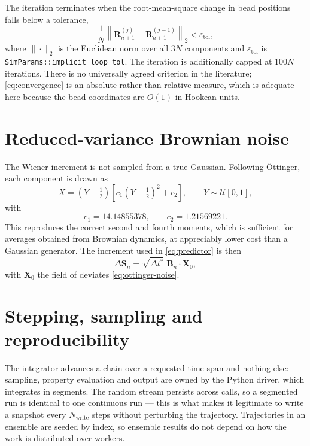\documentclass[11pt,a4paper]{report}
\newcommand{\B}{\bm{B}}
\newcommand{\R}{\bm{R}}
\newcommand{\dt}{\Delta t^{*}}
\newcommand{\code}[1]{\texttt{\seqsplitcode{#1}}}
\newcommand{\seqsplitcode}[1]{#1}
\begin{document}
The iteration terminates when the root-mean-square change in bead positions
falls below a tolerance,
\begin{equation}
  \frac{1}{N}\left\|\R^{(j)}_{n+1} - \R^{(j-1)}_{n+1}\right\|_2
    < \varepsilon_{\mathrm{tol}},
  \label{eq:convergence}
\end{equation}
where $\|\cdot\|_2$ is the Euclidean norm over all $3N$ components and
$\varepsilon_{\mathrm{tol}}$ is \code{SimParams::implicit\_loop\_tol}. The
iteration is additionally capped at $100N$ iterations. There is no universally
agreed criterion in the literature; \eqref{eq:convergence} is an absolute rather
than relative measure, which is adequate here because the bead coordinates are
$O(1)$ in Hookean units.

\section{Reduced-variance Brownian noise}
\label{sec:noise}

The Wiener increment is not sampled from a true Gaussian. Following \"{O}ttinger,
each component is drawn as
\begin{equation}
  X = \left(Y-\tfrac12\right)\left[c_1\left(Y-\tfrac12\right)^2 + c_2\right],
  \qquad Y \sim \mathcal{U}[0,1],
  \label{eq:ottinger-noise}
\end{equation}
with
\begin{equation}
  c_1 = 14.14855378, \qquad c_2 = 1.21569221 .
\end{equation}
This reproduces the correct second and fourth moments, which is sufficient for
averages obtained from Brownian dynamics, at appreciably lower cost than a
Gaussian generator. The increment used in \eqref{eq:predictor} is then
\begin{equation}
  \Delta\bm{S}_n = \sqrt{\dt}\;\B_n\cdot\bm{X}_0 ,
\end{equation}
with $\bm{X}_0$ the field of deviates \eqref{eq:ottinger-noise}.

\section{Stepping, sampling and reproducibility}

The integrator advances a chain over a requested time span and nothing else:
sampling, property evaluation and output are owned by the Python driver, which
integrates in segments. The random stream persists across calls, so a segmented
run is identical to one continuous run --- this is what makes it legitimate to
write a snapshot every $N_{\mathrm{write}}$ steps without perturbing the
trajectory. Trajectories in an ensemble are seeded by index, so ensemble results
do not depend on how the work is distributed over workers.
\end{document}

